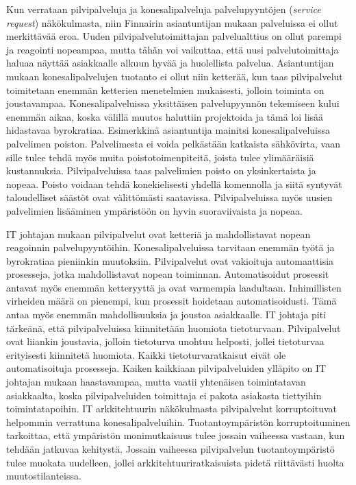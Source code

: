 Kun verrataan pilvipalveluja ja konesalipalveluja palvelupyyntöjen (\emph{service request}) näkökulmasta, niin Finnairin asiantuntijan mukaan palveluissa ei ollut merkittävää eroa. Uuden pilvipalvelutoimittajan palvelualttius on ollut parempi ja reagointi nopeampaa, mutta tähän voi vaikuttaa, että uusi palvelutoimittaja haluaa näyttää asiakkaalle alkuun hyvää ja huolellista palvelua. Asiantuntijan mukaan konesalipalvelujen tuotanto ei ollut niin ketterää, kun taas pilvipalvelut toimitetaan enemmän ketterien menetelmien mukaisesti, jolloin toiminta on joustavampaa. Konesalipalveluissa yksittäisen palvelupyynnön tekemiseen kului enemmän aikaa, koska välillä muutos haluttiin projektoida ja tämä loi lisää hidastavaa byrokratiaa. Esimerkkinä asiantuntija mainitsi konesalipalveluissa palvelimen poiston. Palvelimesta ei voida pelkästään katkaista sähkövirta, vaan sille tulee tehdä myös muita poistotoimenpiteitä, joista tulee ylimääräisiä kustannuksia. Pilvipalveluissa taas palvelimien poisto on yksinkertaista ja nopeaa. Poisto voidaan tehdä konekielisesti yhdellä komennolla ja siitä syntyvät taloudelliset säästöt ovat välittömästi saatavissa. Pilvipalveluissa myös uusien palvelimien lisääminen ympäristöön on hyvin suoraviivaista ja nopeaa.

IT johtajan mukaan pilvipalvelut ovat ketteriä ja mahdollistavat nopean reagoinnin palvelupyyntöihin. Konesalipalveluissa tarvitaan enemmän työtä ja byrokratiaa pieniinkin muutoksiin. Pilvipalvelut ovat vakioituja automaattisia prosesseja, jotka mahdollistavat nopean toiminnan. Automatisoidut prosessit antavat myös enemmän ketteryyttä ja ovat varmempia laadultaan. Inhimillisten virheiden määrä on pienempi, kun prosessit hoidetaan automatisoidusti. Tämä antaa myös enemmän mahdollisuuksia ja joustoa asiakkaalle. IT johtaja piti tärkeänä, että pilvipalveluissa kiinnitetään huomiota tietoturvaan. Pilvipalvelut ovat liiankin joustavia, jolloin tietoturva unohtuu helposti, jollei tietoturvaa erityisesti kiinnitetä huomiota. Kaikki tietoturvaratkaisut eivät ole automatisoituja prosesseja. Kaiken kaikkiaan pilvipalveluiden ylläpito on IT johtajan mukaan haastavampaa, mutta vaatii yhtenäisen toimintatavan asiakkaalta, koska pilvipalveluiden toimittaja ei pakota asiakasta tiettyihin toimintatapoihin. IT arkkitehtuurin näkökulmasta pilvipalvelut korruptoituvat helpommin verrattuna konesalipalveluihin. Tuotantoympäristön korruptoituminen tarkoittaa, että ympäristön monimutkaisuus tulee jossain vaiheessa vastaan, kun tehdään jatkuvaa kehitystä. Jossain vaiheessa pilvipalvelun tuotantoympäristö tulee muokata uudelleen, jollei arkkitehtuuriratkaisuista pidetä riittävästi huolta muutostilanteissa.  

